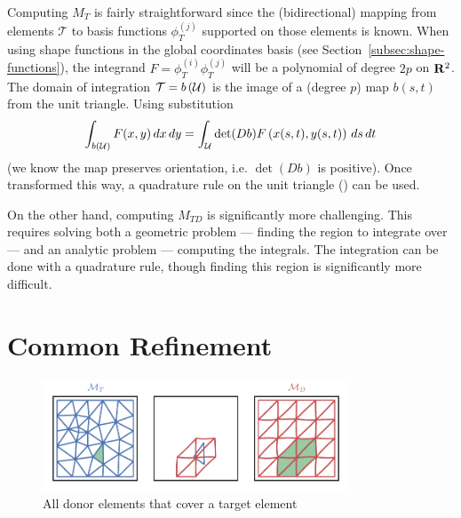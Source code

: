 Computing \(M_T\) is fairly straightforward since the (bidirectional) mapping
from elements \(\mathcal{T}\) to basis functions \(\phi_T^{(j)}\) supported
on those elements is known. When using shape functions in the
global coordinates basis (see Section~\ref{subsec:shape-functions}), the
integrand \(F = \phi_T^{(i)} \phi_T^{(j)}\) will be a polynomial of degree
\(2p\) on \(\mathbf{R}^2\). The domain of integration \(\mathcal{T}
= b\left(\mathcal{U}\right)\) is the image of a (degree \(p\)) map \(b(s, t)\)
from the unit triangle. Using substitution
\begin{equation}\label{eq:mass-mat-subst}
\int_{b\left(\mathcal{U}\right)} F(x, y) \, dx \, dy =
  \int_{\mathcal{U}} \det(Db) F\left(x(s, t), y(s, t)\right) \, ds \, dt
\end{equation}
(we know the map preserves orientation, i.e. \(\det(Db)\) is positive).
Once transformed this way, a quadrature rule on the unit
triangle (\cite{Dunavant1985}) can be used.

On the other hand, computing \(M_{TD}\) is significantly more
challenging. This requires solving both a geometric problem ---
finding the region to integrate over --- and an analytic
problem --- computing the integrals. The integration can be done with
a quadrature rule, though finding this region is significantly
more difficult.

\section{Common Refinement}

\begin{figure}
  \includegraphics[width=0.8125\textwidth]
                  {../images/curved-mesh/main_figure02.pdf}
  \centering
  \captionsetup{width=.75\linewidth}
  \caption{All donor elements that cover a target element}
  \label{fig:target-elt-all-matching}
\end{figure}

